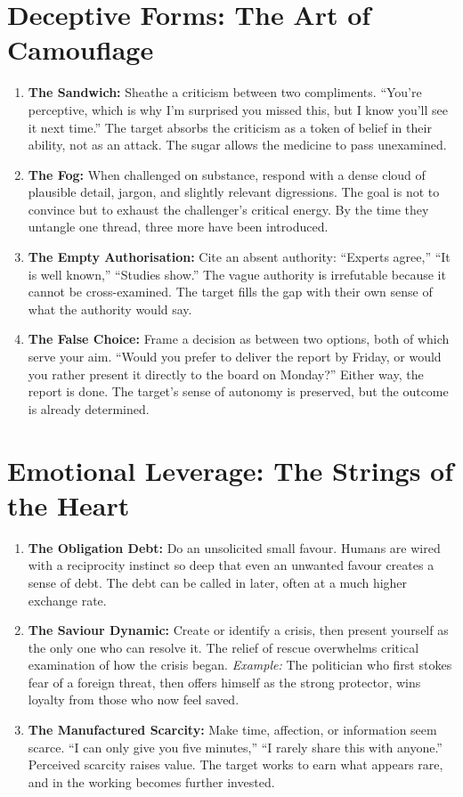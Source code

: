 \documentclass[12pt,a4paper,oneside]{book}
\begin{document}
\section{Deceptive Forms: The Art of Camouflage}
\begin{enumerate}[leftmargin=*, label=\arabic*.]
\item \textbf{The Sandwich:} Sheathe a criticism between two compliments. “You're perceptive, which is why I'm surprised you missed this, but I know you'll see it next time.” The target absorbs the criticism as a token of belief in their ability, not as an attack. The sugar allows the medicine to pass unexamined.
\item \textbf{The Fog:} When challenged on substance, respond with a dense cloud of plausible detail, jargon, and slightly relevant digressions. The goal is not to convince but to exhaust the challenger's critical energy. By the time they untangle one thread, three more have been introduced.
\item \textbf{The Empty Authorisation:} Cite an absent authority: “Experts agree,” “It is well known,” “Studies show.” The vague authority is irrefutable because it cannot be cross-examined. The target fills the gap with their own sense of what the authority would say.
\item \textbf{The False Choice:} Frame a decision as between two options, both of which serve your aim. “Would you prefer to deliver the report by Friday, or would you rather present it directly to the board on Monday?” Either way, the report is done. The target's sense of autonomy is preserved, but the outcome is already determined.
\end{enumerate}

\section{Emotional Leverage: The Strings of the Heart}
\begin{enumerate}[leftmargin=*, label=\arabic*.]
\item \textbf{The Obligation Debt:} Do an unsolicited small favour. Humans are wired with a reciprocity instinct so deep that even an unwanted favour creates a sense of debt. The debt can be called in later, often at a much higher exchange rate.
\item \textbf{The Saviour Dynamic:} Create or identify a crisis, then present yourself as the only one who can resolve it. The relief of rescue overwhelms critical examination of how the crisis began. \textit{Example:} The politician who first stokes fear of a foreign threat, then offers himself as the strong protector, wins loyalty from those who now feel saved.
\item \textbf{The Manufactured Scarcity:} Make time, affection, or information seem scarce. “I can only give you five minutes,” “I rarely share this with anyone.” Perceived scarcity raises value. The target works to earn what appears rare, and in the working becomes further invested.
\end{enumerate}
\end{document}
